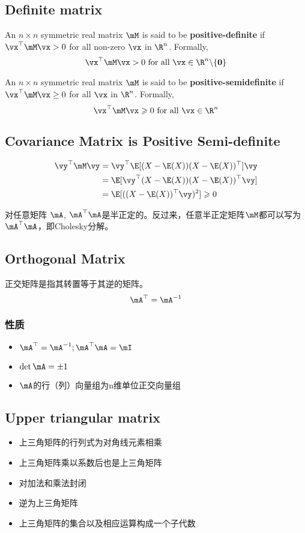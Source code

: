 \subsection{Definite matrix}
An $n \times n$ symmetric real matrix $\mM$ is said to be \textbf{positive-definite} if $\vx^\top \mM \vx > 0$ for all non-zero $\vx$ in $\R^n$. Formally,
\[\vx^\top \mM \vx > 0 \ \text{for all}\ \vx \in \R^n \backslash \{\mathbf{0}\}\]

An $n \times n$ symmetric real matrix $\mM$ is said to be \textbf{positive-semidefinite} if $\vx^\top \mM \vx \geq 0$ for all $\vx$ in $\R^n$. Formally,
\[\vx^\top \mM \vx \geqslant 0 \ \text{for all}\ \vx \in \R^n \]

\subsection{Covariance Matrix is Positive Semi-definite}
\[
    \begin{split}
        \vy^\top \mM \vy 
        &= \vy^\top \E[(X - \E(X))(X - \E(X))^\top] \vy \\
        &= \E[\vy^\top(X - \E(X))(X - \E(X))^\top\vy] \\
        &= \E[((X - \E(X))^\top\vy)^2] \geqslant 0
    \end{split}
\]


对任意矩阵 $\mA$, $\mA^\top\mA$是半正定的。反过来，任意半正定矩阵$\mM$都可以写为$\mA^\top\mA$，即Cholesky分解。

\subsection{Orthogonal Matrix}
正交矩阵是指其转置等于其逆的矩阵。
\[\mA^\top = \mA^{-1}\]

\subsubsection{性质}
\begin{itemize}
    \item $\mA^\top = \mA^{-1}; \mA^\top \mA = \mI$
    \item $\det{\mA} = \pm 1$
    \item $\mA$的行（列）向量组为n维单位正交向量组
\end{itemize}


\subsection{Upper triangular matrix}
\begin{itemize}
    \item 上三角矩阵的行列式为对角线元素相乘
    \item 上三角矩阵乘以系数后也是上三角矩阵
    \item 对加法和乘法封闭
    \item 逆为上三角矩阵
    \item 上三角矩阵的集合以及相应运算构成一个子代数
\end{itemize}

